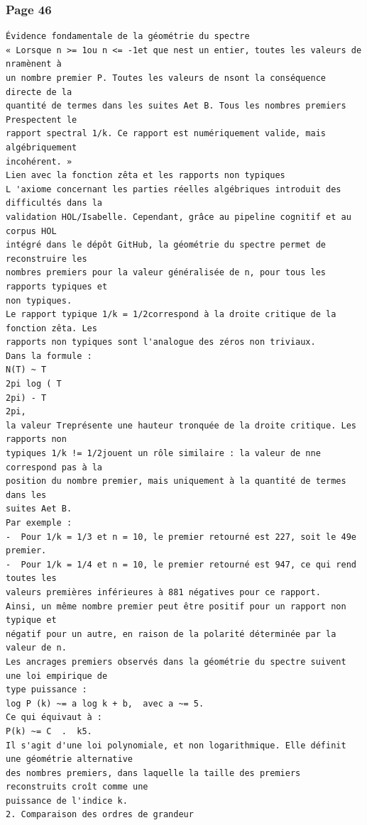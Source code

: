\documentclass[11pt,a4paper]{article}
\begin{document}
\subsubsection*{Page 46}
\begin{Verbatim}[fontsize=\footnotesize]
Évidence fondamentale de la géométrie du spectre 
« Lorsque n >= 1ou n <= -1et que nest un entier, toutes les valeurs de nramènent à 
un nombre premier P. Toutes les valeurs de nsont la conséquence directe de la 
quantité de termes dans les suites Aet B. Tous les nombres premiers Prespectent le 
rapport spectral 1/k. Ce rapport est numériquement valide, mais algébriquement 
incohérent. » 
Lien avec la fonction zêta et les rapports non typiques 
L 'axiome concernant les parties réelles algébriques introduit des difficultés dans la 
validation HOL/Isabelle. Cependant, grâce au pipeline cognitif et au corpus HOL 
intégré dans le dépôt GitHub, la géométrie du spectre permet de reconstruire les 
nombres premiers pour la valeur généralisée de n, pour tous les rapports typiques et 
non typiques. 
Le rapport typique 1/k = 1/2correspond à la droite critique de la fonction zêta. Les 
rapports non typiques sont l'analogue des zéros non triviaux. 
Dans la formule : 
N(T) ~ T
2pi log ( T
2pi) - T
2pi, 
la valeur Treprésente une hauteur tronquée de la droite critique. Les rapports non 
typiques 1/k != 1/2jouent un rôle similaire : la valeur de nne correspond pas à la 
position du nombre premier, mais uniquement à la quantité de termes dans les 
suites Aet B. 
Par exemple : 
-  Pour 1/k = 1/3 et n = 10, le premier retourné est 227, soit le 49e premier.
-  Pour 1/k = 1/4 et n = 10, le premier retourné est 947, ce qui rend toutes les
valeurs premières inférieures à 881 négatives pour ce rapport. 
Ainsi, un même nombre premier peut être positif pour un rapport non typique et 
négatif pour un autre, en raison de la polarité déterminée par la valeur de n. 
Les ancrages premiers observés dans la géométrie du spectre suivent une loi empirique de 
type puissance : 
log P (k) ~= a log k + b,  avec a ~= 5. 
Ce qui équivaut à : 
P(k) ~= C  .  k5. 
Il s'agit d'une loi polynomiale, et non logarithmique. Elle définit une géométrie alternative 
des nombres premiers, dans laquelle la taille des premiers reconstruits croît comme une 
puissance de l'indice k. 
2. Comparaison des ordres de grandeur 
\end{Verbatim}
\medskip
\end{document}
